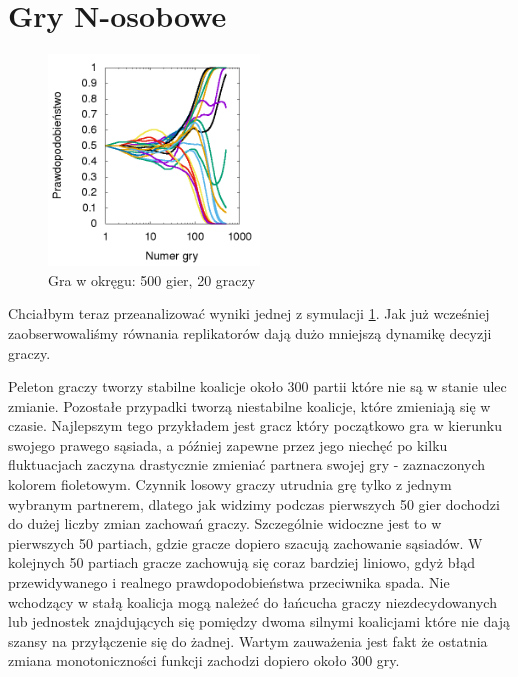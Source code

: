 \section{Gry N-osobowe}
\label{sec:N3zal}
\begin{figure}
    \centering
    \includegraphics[width=0.5\textwidth]{pict/wyniki/g500p20}   
    \caption{Gra w okręgu: 500 gier, 20 graczy}
	\label{fig:podst} 
\end{figure}

Chciałbym teraz przeanalizować wyniki jednej z symulacji \ref{fig:podst}. Jak już wcześniej zaobserwowaliśmy równania replikatorów dają dużo mniejszą dynamikę decyzji graczy.

Peleton graczy tworzy stabilne koalicje około 300 partii które nie są w stanie ulec zmianie. Pozostałe przypadki tworzą niestabilne koalicje, które zmieniają się w czasie. Najlepszym tego przykładem jest gracz który początkowo gra w kierunku swojego prawego sąsiada, a później zapewne przez jego niechęć po kilku fluktuacjach zaczyna drastycznie zmieniać partnera swojej gry - zaznaczonych kolorem fioletowym. Czynnik losowy graczy utrudnia grę tylko z jednym wybranym partnerem, dlatego jak widzimy podczas pierwszych 50 gier dochodzi do dużej liczby zmian zachowań graczy. Szczególnie widoczne jest to w pierwszych 50 partiach, gdzie gracze dopiero szacują zachowanie sąsiadów. W kolejnych 50 partiach gracze zachowują się coraz bardziej liniowo, gdyż błąd przewidywanego i realnego prawdopodobieństwa przeciwnika spada. Nie wchodzący w stałą koalicja mogą należeć do łańcucha graczy niezdecydowanych lub jednostek znajdujących się pomiędzy dwoma silnymi koalicjami które nie dają szansy na przyłączenie się do żadnej. Wartym zauważenia jest fakt że ostatnia zmiana monotoniczności funkcji zachodzi dopiero około 300 gry.

